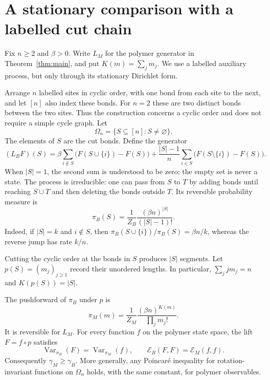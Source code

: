 \section{A stationary comparison with a labelled cut chain}
\label{proof:sec:representation}

Fix $n\geq2$ and $\beta>0$. Write $L_M$ for the polymer generator in
Theorem~\ref{thm:main}, and put $K(m)=\sum_jm_j$. We use a labelled
auxiliary process, but only through its stationary Dirichlet form.

Arrange $n$ labelled sites in cyclic order, with one bond from each site to
the next, and let $[n]$ also index these bonds. For $n=2$ these are two
distinct bonds between the two sites. Thus the construction concerns a
cyclic order and does not require a simple cycle graph. Let
\[
 \Omega_n=\{S\subseteq[n]:S\neq\varnothing\}.
\]
The elements of $S$ are the cut bonds. Define the generator
\begin{equation}\label{proof:eq:LB}
 (L_BF)(S)=\beta\sum_{i\notin S}\bigl(F(S\cup\{i\})-F(S)\bigr)
 +\frac{|S|-1}{n}\sum_{i\in S}\bigl(F(S\setminus\{i\})-F(S)\bigr).
\end{equation}
When $|S|=1$, the second sum is understood to be zero; the empty set is
never a state. The process is irreducible: one can pass from $S$ to $T$
by adding bonds until reaching $S\cup T$ and then deleting the bonds
outside $T$. Its reversible probability measure is
\begin{equation}\label{proof:eq:piB}
 \pi_B(S)=\frac1{Z_B}\frac{(\beta n)^{|S|}}{(|S|-1)!}.
\end{equation}
Indeed, if $|S|=k$ and $i\notin S$, then
$\pi_B(S\cup\{i\})/\pi_B(S)=\beta n/k$, whereas the reverse jump has
rate $k/n$.

Cutting the cyclic order at the bonds in $S$ produces $|S|$ segments.
Let $p(S)=(m_j)_{j\geq1}$ record their unordered lengths. In particular,
$\sum_jjm_j=n$ and $K(p(S))=|S|$.

\begin{proposition}\label{proof:prop:comparison}
The pushforward of $\pi_B$ under $p$ is
\begin{equation}\label{proof:eq:piM}
 \pi_M(m)=\frac1{Z_M}\frac{(\beta n)^{K(m)}}{\prod_jm_j!}.
\end{equation}
It is reversible for $L_M$. For every function $f$ on the polymer state
space, the lift $F=f\circ p$ satisfies
\begin{equation}\label{proof:eq:dirichletcomparison}
 \operatorname{Var}_{\pi_B}(F)=\operatorname{Var}_{\pi_M}(f),
 \qquad
 \mathcal E_B(F,F)=\mathcal E_M(f,f).
\end{equation}
Consequently $\gamma_M\geq\gamma_B$. More generally, any Poincar\'e
inequality for rotation-invariant functions on $\Omega_n$ holds, with
the same constant, for polymer observables.
\end{proposition}

